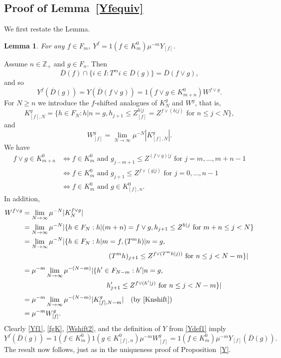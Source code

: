 \documentclass[12pt]{article}
\makeatletter
\renewenvironment{proof}[1][\proofname]{%
\par\pushQED{\qed}\normalfont%
\topsep6\p@\@plus6\p@\relax
\trivlist\item[\hskip\labelsep\bfseries#1\@addpunct{.}]%
\ignorespaces
}{%
\popQED\endtrivlist\@endpefalse
}
\numberwithin{theorem}{section}
\newtheorem{lemma}[theorem]{Lemma}
\theoremstyle{def}
\numberwithin{equation}{section}
\newcommand{\Z}{\mathbb{Z}}
\makeatother
\begin{document}
{\subsection{Proof of Lemma~\ref{Yfequiv}}\label{app:subsec:Yfequiv}
We first restate the Lemma.
\begin{lemma}\label{Yfequivapp}For any $f\in F_m$, $Y^f=1(f\in K^0_m)\mu^{-m}Y_{[f]}$.
\end{lemma}
\begin{proof}
Assume $n\in\Z_+$ and $g\in F_n$.  Then
\[\overline D(f)\cap\{i\in I:T^mi\in \overline D(g)\}=\overline D(f\vee g),
\]
and so 
\begin{equation}\label{Yf1}
Y^f(\overline D(g))=Y(\overline D(f\vee g))=1(f\vee g\in K^0_{m+n})W^{f\vee g}.
\end{equation}
For $N\ge n$ we introduce the $f$-shifted analogues of $K^g_N$ and $W^g$, that is,  
\begin{equation}\label{Knshift}
K^g_{[f],N}=\{h\in F_N:h|n=g, h_{j+1}\le Z^{h|j}_{[f]}=Z^{f\vee (h|j)}\text{ for }n\le j<N\},
\end{equation}
and
\begin{equation*}%
W^g_{[f]}=\lim_{N\to\infty} \mu^{-N}|K^g_{[f],N}|.
\end{equation*}
We have 
\begin{align}\label{fgK}
\nonumber f\vee g\in K^0_{m+n}&\iff f\in K^0_m\text{ and }g_{j-m+1}\le Z^{(f\vee g)|j}\text{ for }j=m,\dots,m+n-1\\
 &\iff f\in K^0_m\text{ and }g_{j+1}\le Z^{f\vee(g|j)}\text{ for }j=0,\dots,n-1\\
\nonumber&\iff f\in K^0_m\text{ and }g\in K^0_{[f],n}.
\end{align}
In addition, 
\begin{align}\label{Wshift2}
\nonumber W^{f\vee g}&=\lim_{N\to\infty}\mu^{-N}|K^{f\vee g}_N|\\
\nonumber &=\lim_{N\to\infty}\mu^{-N} |\{h\in F_N:h|(m+n)=f\vee g, h_{j+1}\le Z^{h|j}\text{ for }m+n\le j<N\}\\
\nonumber &=\lim_{N\to\infty}\mu^{-N} |\{h\in F_N:h|m=f, (T^mh)|n=g, \\
\nonumber &\phantom{=\lim_{N\to\infty}\mu^{-N} |\{h\in F_N:h_1=}(T^mh)_{j+1}\le Z^{f\vee (T^mh|j))}\text{ for }n\le j<N-m\}|\\
\nonumber &=\mu^{-m}\lim_{N\to\infty}\mu^{-(N-m)}|\{h'\in F_{N-m}:h'|n=g,\\
\nonumber &\phantom{=\lim_{n\to\infty}\mu^{-n} |\{h\in F_n:h_1=\ }h'_{j+1}\le Z^{f\vee (h'|j)}\text{ for }n\le j<N-m\}|\\
\nonumber &=\mu^{-m}\lim_{N\to\infty}\mu^{-(N-m)}|K^g_{[f],N-m}|\quad\text{(by \eqref{Knshift})}\\
&=\mu^{-m} W^g_{[f]}.
\end{align}
Clearly \eqref{Yf1}, \eqref{fgK}, \eqref{Wshift2}, and the definition of $Y$ from \eqref{Ydef1} imply
\[Y^f(\overline D(g))=1(f\in K^0_m)1(g\in K^0_{[f],n})\mu^{-m}W_{[f]}^g=1(f\in K^0_m)\mu^{-m}Y_{[f]}(\overline D(g)).\]
The result now follows, just as in the uniqueness proof of Proposition~\ref{Y}.
\end{proof}

}
\end{document}
